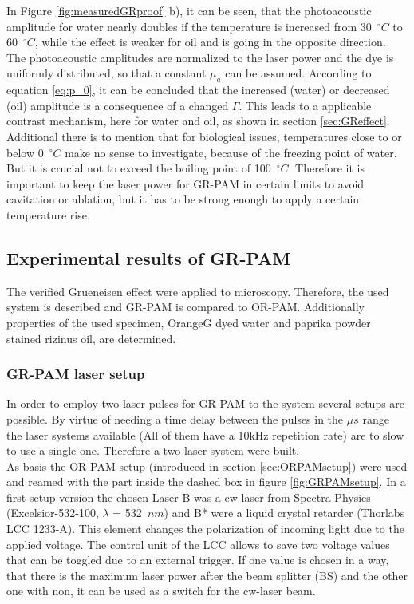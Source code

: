 In Figure \ref{fig:measuredGRproof} b), it can be seen, that the photoacoustic amplitude for water nearly doubles if the temperature is increased from 30~$^\circ C$ to  60~$^\circ C$, while the effect is weaker for oil and is going in the opposite direction.\\
The photoacoustic amplitudes are normalized to the laser power and the dye is uniformly distributed, so that a constant $\mu_a$ can be assumed. According to equation \ref{eq:p_0}, it can be concluded that the increased (water) or decreased (oil) amplitude is a consequence of a changed $\Gamma$. This leads to a applicable contrast mechanism, here for water and oil, as shown in section \ref{sec:GReffect}.\\
Additional there is to mention that for biological issues, temperatures close to or below 0~$^\circ C$ make no sense to investigate, because of the freezing point of water. But it is crucial not to exceed the boiling point of 100~$^\circ C$. Therefore it is important to keep the laser power for GR-PAM in certain limits to avoid cavitation or ablation, but it has to be strong enough to apply a certain temperature rise. 

\subsection{Experimental results of GR-PAM}

The verified Grueneisen effect were applied to microscopy. Therefore, the used system is described and GR-PAM is compared to OR-PAM. Additionally properties of the used specimen, OrangeG dyed water and paprika powder stained rizinus oil, are determined.

\subsubsection{GR-PAM laser setup}

In order to employ two laser pulses for GR-PAM to the system several setups are possible. By virtue of needing a time delay between the pulses in the $\mu s$ range the laser systems available (All of them have a 10kHz repetition rate) are to slow to use a single one. Therefore a two laser system were built.\\
As basis the OR-PAM setup (introduced in section \ref{sec:ORPAMsetup}) were used and reamed with the part inside the dashed box in figure \ref{fig:GRPAMsetup}. In a first setup version the chosen Laser B was a cw-laser from Spectra-Physics (Excelsior-532-100, $\lambda$ = 532~$nm$) and B* were a liquid crystal retarder (Thorlabs LCC 1233-A). This element changes the polarization of incoming light due to the applied voltage. The control unit of the LCC allows to save two voltage values that can be toggled due to an external trigger. If one value is chosen in a way, that there is the maximum laser power after the beam splitter (BS) and the other one with non, it can be used as a switch for the cw-laser beam. 

